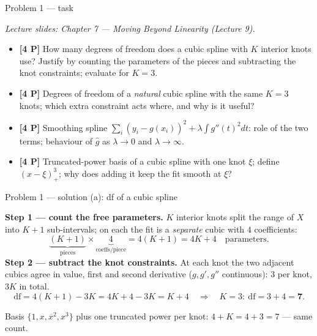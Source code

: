 \documentclass[aspectratio=169,11pt]{beamer}
\begin{document}
\begin{frame}{Problem 1 --- task}
  \begin{exercise}
    {\scriptsize\itshape Lecture slides: Chapter 7 --- Moving Beyond Linearity (Lecture 9).}\par\smallskip
    \begin{itemize}
      \item[(a)] \textbf{[4 P]} How many degrees of freedom does a cubic spline with $K$ interior
        knots use? Justify by counting the parameters of the pieces and subtracting the knot
        constraints; evaluate for $K=3$.
      \item[(b)] \textbf{[4 P]} Degrees of freedom of a \emph{natural} cubic spline with the same
        $K=3$ knots; which extra constraint acts where, and why is it useful?
      \item[(c)] \textbf{[4 P]} Smoothing spline
        $\sum_i (y_i-g(x_i))^2+\lambda\int g''(t)^2dt$: role of the two terms;
        behaviour of $\hat g$ as $\lambda\to 0$ and $\lambda\to\infty$.
      \item[(d)] \textbf{[4 P]} Truncated-power basis of a cubic spline with one knot $\xi$;
        define $(x-\xi)^3_+$; why does adding it keep the fit smooth at $\xi$?
    \end{itemize}
  \end{exercise}
\end{frame}

\begin{frame}{Problem 1 --- solution (a): df of a cubic spline}
  \begin{solutionbox}
    \textbf{Step 1 --- count the free parameters.} $K$ interior knots split the range of $X$ into
    $K+1$ sub-intervals; on each the fit is a \emph{separate} cubic with $4$ coefficients:
    \[
      \underbrace{(K+1)}_{\text{pieces}}\times\underbrace{4}_{\text{coeffs/piece}}=4(K+1)=4K+4
      \quad\text{parameters.}
    \]
    \textbf{Step 2 --- subtract the knot constraints.} At each knot the two adjacent cubics agree
    in value, first and second derivative ($g,g',g''$ continuous): $3$ per knot, $3K$ in total.
    \[
      \mathrm{df}=4(K+1)-3K=4K+4-3K=K+4
      \quad\Longrightarrow\quad K=3:\ \mathrm{df}=3+4=\mathbf{7}.
    \]
    \begin{takeaway}
      Basis $\{1,x,x^2,x^3\}$ plus one truncated power per knot: $4+K=4+3=7$ --- same count.
    \end{takeaway}
  \end{solutionbox}
\end{frame}
\end{document}
